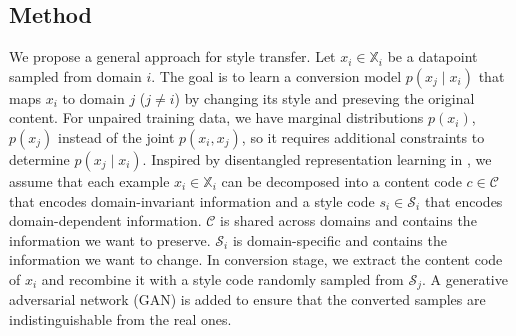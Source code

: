 \documentclass{article}
\begin{document}



\subsection{Method}
We propose a general approach for style transfer. %
Let $x_i \in \mathbb{X}_i$ be a datapoint sampled from domain $i$. The goal is to learn a conversion model $p(x_j \mid x_i)$ that maps $x_i$ to domain $j$ ($j\neq i$) by changing its style and preseving the original content. For unpaired training data, we have marginal distributions $p(x_i)$, $p(x_j)$ instead of the joint $p(x_i, x_j)$, so it requires additional constraints to determine $p(x_j\mid x_i)$. Inspired by disentangled representation learning in \cite{DBLP:journals/corr/GatysEB15a}, we assume that each example $x_i \in \mathbb{X}_i$ can be decomposed into a content code $c\in \mathcal{C}$ that encodes domain-invariant information and a style code $s_i\in \mathcal{S}_i$ that encodes domain-dependent information. $\mathcal{C}$ is shared across domains and contains the information we want to preserve. $\mathcal{S}_i$ is domain-specific and contains the information we want to change. In conversion stage, we extract the content code of $x_i$ and recombine it with a style code randomly sampled from $\mathcal{S}_j$. A generative adversarial network (GAN) \cite{NIPS2014_5423} is added to ensure that the converted samples are indistinguishable from the real ones.
\end{document}
